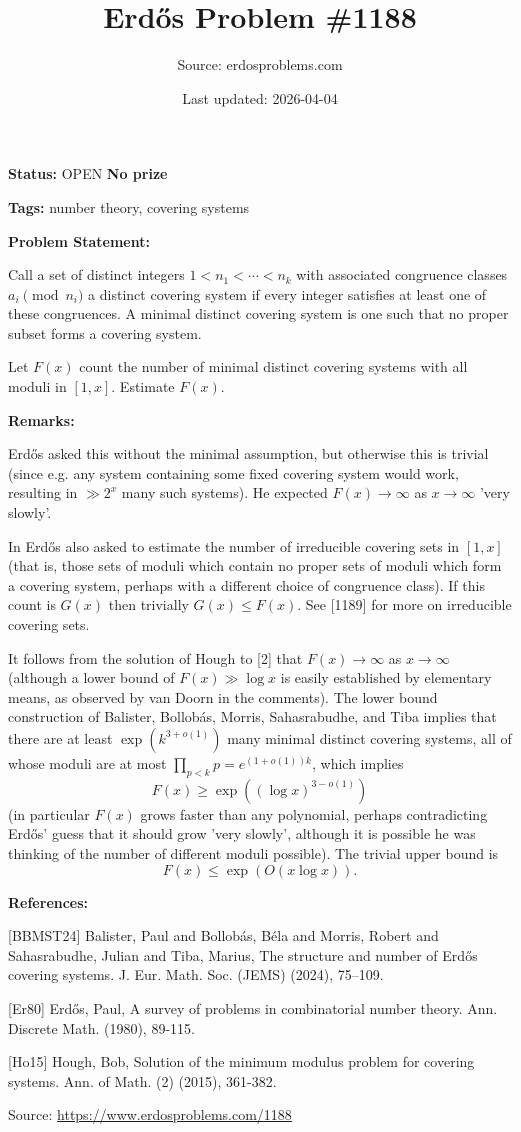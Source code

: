 \documentclass{article}
\title{Erd\H{o}s Problem \#1188}
\date{Last updated: 2026-04-04}
\author{Source: erdosproblems.com}
\begin{document}
\maketitle

\noindent\textbf{Status:} OPEN \quad \textbf{No prize}

\noindent\textbf{Tags:} number theory, covering systems

\medskip
\noindent\textbf{Problem Statement:}

Call a set of distinct integers $1<n_1<\cdots<n_k$ with associated congruence classes $a_i\pmod{n_i}$ a distinct covering system if every integer satisfies at least one of these congruences. A minimal distinct covering system is one such that no proper subset forms a covering system.

Let $F(x)$ count the number of minimal distinct covering systems with all moduli in $[1,x]$. Estimate $F(x)$.

\bigskip
\noindent\textbf{Remarks:}

Erd\H{o}s \cite{Er80} asked this without the minimal assumption, but otherwise this is trivial (since e.g. any system containing some fixed covering system would work, resulting in $\gg 2^x$ many such systems). He expected $F(x)\to \infty$ as $x\to \infty$ 'very slowly'.

In \cite{Er80} Erd\H{o}s also asked to estimate the number of irreducible covering sets in $[1,x]$ (that is, those sets of moduli which contain no proper sets of moduli which form a covering system, perhaps with a different choice of congruence class). If this count is $G(x)$ then trivially $G(x)\leq F(x)$. See [1189] for more on irreducible covering sets.

It follows from the solution of Hough \cite{Ho15} to [2] that $F(x)\to \infty$ as $x\to \infty$ (although a lower bound of $F(x) \gg \log x$ is easily established by elementary means, as observed by van Doorn in the comments). The lower bound construction of Balister, Bollob\'{a}s, Morris, Sahasrabudhe, and Tiba \cite{BBMST24} implies that there are at least $\exp(k^{3+o(1)})$ many minimal distinct covering systems, all of whose moduli are at most $\prod_{p<k}p=e^{(1+o(1))k}$, which implies\[F(x)\geq \exp((\log x)^{3-o(1)})\](in particular $F(x)$ grows faster than any polynomial, perhaps contradicting Erd\H{o}s' guess that it should grow 'very slowly', although it is possible he was thinking of the number of different moduli possible). The trivial upper bound is\[F(x) \leq \exp(O(x\log x)).\]

\bigskip
\noindent\textbf{References:}

[BBMST24] Balister, Paul and Bollob\'{a}s, B\'ela and Morris, Robert and
Sahasrabudhe, Julian and Tiba, Marius, The structure and number of {E}rd\H os covering systems. J. Eur. Math. Soc. (JEMS) (2024), 75--109.
 
 [Er80] Erd\H{o}s, Paul, A survey of problems in combinatorial number theory. Ann. Discrete Math. (1980), 89-115.
 
 [Ho15] Hough, Bob, Solution of the minimum modulus problem for covering systems. Ann. of Math. (2) (2015), 361-382.

\bigskip
\noindent\small{Source: \url{https://www.erdosproblems.com/1188}}
\end{document}
